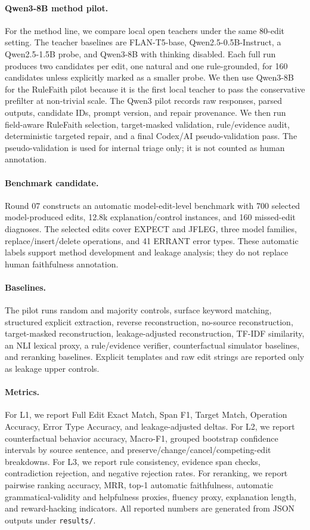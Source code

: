 \paragraph{Qwen3-8B method pilot.}
For the method line, we compare local open teachers under the same 80-edit setting. The teacher baselines are FLAN-T5-base, Qwen2.5-0.5B-Instruct, a Qwen2.5-1.5B probe, and Qwen3-8B with thinking disabled. Each full run produces two candidates per edit, one natural and one rule-grounded, for 160 candidates unless explicitly marked as a smaller probe. We then use Qwen3-8B for the RuleFaith pilot because it is the first local teacher to pass the conservative prefilter at non-trivial scale. The Qwen3 pilot records raw responses, parsed outputs, candidate IDs, prompt version, and repair provenance. We then run field-aware RuleFaith selection, target-masked validation, rule/evidence audit, deterministic targeted repair, and a final Codex/AI pseudo-validation pass. The pseudo-validation is used for internal triage only; it is not counted as human annotation.

\paragraph{Benchmark candidate.}
Round 07 constructs an automatic model-edit-level benchmark with 700 selected model-produced edits, 12.8k explanation/control instances, and 160 missed-edit diagnoses. The selected edits cover EXPECT and JFLEG, three model families, replace/insert/delete operations, and 41 ERRANT error types. These automatic labels support method development and leakage analysis; they do not replace human faithfulness annotation.

\paragraph{Baselines.}
The pilot runs random and majority controls, surface keyword matching, structured explicit extraction, reverse reconstruction, no-source reconstruction, target-masked reconstruction, leakage-adjusted reconstruction, TF-IDF similarity, an NLI lexical proxy, a rule/evidence verifier, counterfactual simulator baselines, and reranking baselines. Explicit templates and raw edit strings are reported only as leakage upper controls.

\paragraph{Metrics.}
For L1, we report Full Edit Exact Match, Span F1, Target Match, Operation Accuracy, Error Type Accuracy, and leakage-adjusted deltas. For L2, we report counterfactual behavior accuracy, Macro-F1, grouped bootstrap confidence intervals by source sentence, and preserve/change/cancel/competing-edit breakdowns. For L3, we report rule consistency, evidence span checks, contradiction rejection, and negative rejection rates. For reranking, we report pairwise ranking accuracy, MRR, top-1 automatic faithfulness, automatic grammatical-validity and helpfulness proxies, fluency proxy, explanation length, and reward-hacking indicators. All reported numbers are generated from JSON outputs under \texttt{results/}.
